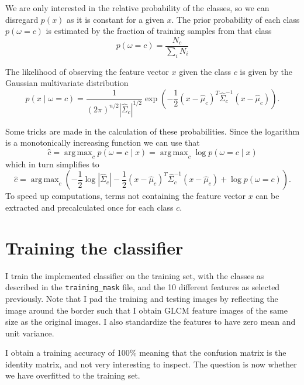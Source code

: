 \documentclass[a4paper]{article}
\DeclareMathOperator*{\argmax}{arg\,max}
\begin{document}
We are only interested in the relative probability of the classes, so we
can disregard $p(x)$ as it is constant for a given $x$. The prior
probability of each class $p(\omega = c)$ is estimated by the fraction
of training samples from that class
\begin{equation}
    p(\omega = c) = \frac{N_c}{\sum_i N_i}
\end{equation}

The likelihood of observing the feature vector $x$ given the class $c$
is given by the Gaussian multivariate distribution
\begin{equation}
    p(x \mid \omega = c) = \frac{1}{(2\pi)^{n/2}
    \left|{\hat{\Sigma}_c}\right|^{1/2}} \exp\left({-\frac{1}{2} (x -
    \hat{\mu}_c)^T\hat{\Sigma}_c^{-1}(x - \hat{\mu}_c)}\right).
\end{equation}

Some tricks are made in the calculation of these probabilities. Since
the logarithm is a monotonically increasing function we can use that
\begin{equation}
    \hat{c} = \argmax_c p(\omega = c \mid x) = \argmax_c \log p(\omega =
    c \mid x)
\end{equation}
which in turn simplifies to
\begin{equation}
    \hat{c} = \argmax_c \left( -\frac{1}{2} \log |\hat{\Sigma}_c| -\frac{1}{2}
    (x - \hat{\mu}_c)^T\hat{\Sigma}_c^{-1}(x - \hat{\mu}_c) + \log
    p(\omega = c)\right).
\end{equation}
To speed up computations, terms not containing the feature vector $x$
can be extracted and precalculated once for each class $c$.

\section{Training the classifier}

I train the implemented classifier on the training set, with the classes
as described in the \texttt{training\_mask} file, and the 10 different
features as selected previously. Note that I pad the training and
testing images by reflecting the image around the border such that I
obtain GLCM feature images of the same size as the original images. I
also standardize the features to have zero mean and unit variance.

I obtain a training accuracy of 100\% meaning that the confusion matrix
is the identity matrix, and not very interesting to inspect. The
question is now whether we have overfitted to the training set.
\end{document}

